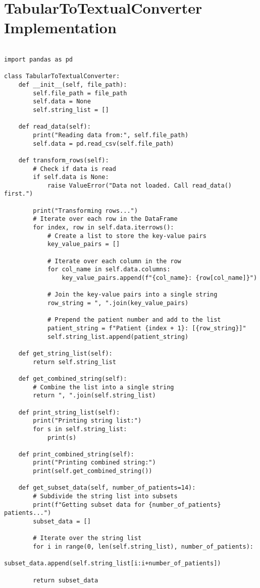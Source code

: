 \chapter*{TabularToTextualConverter Implementation}
\label{app:tabTotext_appendix}

\begin{verbatim}

import pandas as pd

class TabularToTextualConverter:
    def __init__(self, file_path):
        self.file_path = file_path
        self.data = None
        self.string_list = []

    def read_data(self):
        print("Reading data from:", self.file_path)
        self.data = pd.read_csv(self.file_path)
    
    def transform_rows(self):
        # Check if data is read
        if self.data is None:
            raise ValueError("Data not loaded. Call read_data() first.")
        
        print("Transforming rows...")
        # Iterate over each row in the DataFrame
        for index, row in self.data.iterrows():
            # Create a list to store the key-value pairs
            key_value_pairs = []
            
            # Iterate over each column in the row
            for col_name in self.data.columns:
                key_value_pairs.append(f"{col_name}: {row[col_name]}")
            
            # Join the key-value pairs into a single string
            row_string = ", ".join(key_value_pairs)
            
            # Prepend the patient number and add to the list
            patient_string = f"Patient {index + 1}: [{row_string}]"
            self.string_list.append(patient_string)

    def get_string_list(self):
        return self.string_list

    def get_combined_string(self):
        # Combine the list into a single string
        return ", ".join(self.string_list)

    def print_string_list(self):
        print("Printing string list:")
        for s in self.string_list:
            print(s)

    def print_combined_string(self):
        print("Printing combined string:")
        print(self.get_combined_string())

    def get_subset_data(self, number_of_patients=14):
        # Subdivide the string list into subsets
        print(f"Getting subset data for {number_of_patients} patients...")
        subset_data = []
        
        # Iterate over the string list
        for i in range(0, len(self.string_list), number_of_patients):
            subset_data.append(self.string_list[i:i+number_of_patients])

        return subset_data
        
\end{verbatim}